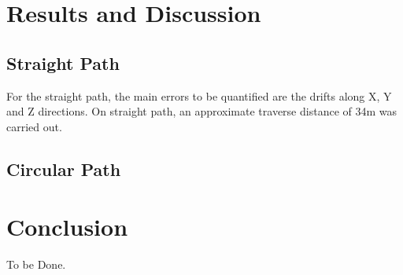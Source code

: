 \documentclass[a4paper, 10pt, conference]{ieeeconf}      %
\begin{document}
\section{Results and Discussion}
\subsection{Straight Path}
For the straight path, the main errors to be quantified are the drifts along X, Y and Z directions. On straight path, an approximate traverse distance of 34m was carried out. 
\subsection{Circular Path}
\section{Conclusion}
To be Done.



\end{document}
